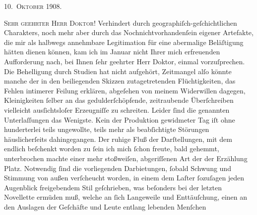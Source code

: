 \pstart
           \raggedleft{}\textsc{10. Oktober 1908}.\pend
           \pend
           
\pstart\center{}\textsc{Sehr geehrter Herr Doktor!}\pend\vspace{0.5em}
\pstart
           Verhindert durch \label{K_L01792-1v}\label{K_L01792-1} geographiſch-geſchichtlichen Charakters, noch mehr aber durch
               das Nochnichtvorhandenſein eigener Artefakte, die mir als halbwegs annehmbare
               Legitimation für eine abermalige Beläſtigung hätten dienen können, kam ich im
                  Januar nicht Ihrer mich erfreuenden Aufforderung nach, bei Ihnen{ }ſehr
               geehrter Herr Doktor, einmal vorzuſprechen. Die Behelligung durch Studien hat nicht
               aufgehört, Zeitmangel alſo könnte manche der in den beiliegenden Skizzen
               zutagetretenden Flüchtigkeiten, das Fehlen intimerer Feilung erklären, {\pb}abgeſehen von meinem Widerwillen dagegen,
               Kleinigkeiten{ }ſelber an das gedulderſchöpfende, zeitraubende Überſchreiben vielleicht
               ausſichtsloſer Erzeugniſſe zu schreiten. Leider{ }ſind die genannten Unterlaſſungen das
               Wenigste. Kein der Produktion gewidmeter Tag iſt ohne hunderterlei teils ungewollte,
               teils mehr als beabſichtigte Störungen häuslicherſeits dahingegangen. Der ruhige Fluß
               der Darſtellungen, mit dem endlich beſchenkt worden zu{ }ſein ich mich{ }ſchon freute,
               bald gehemmt, unterbrochen machte einer mehr stoßweiſen, abgeriſſenen Art der
               der Erzählung Platz. Notwendig{ }ſind die vorliegenden Darbietungen,{ }ſobald
               Schwung {\pb}und Stimmung von außen
               verſcheucht worden, in einem dem Laſter{ }ſozuſagen jeden Augenblick freigebendem Stil
               geſchrieben, was beſonders bei der letzten Novellette ermüden muß, welche an{ }ſich Langeweile und
               Enttäuſchung, einen an den Auslagen der Geſchäfte und Leute entlang lebenden Menſchen
